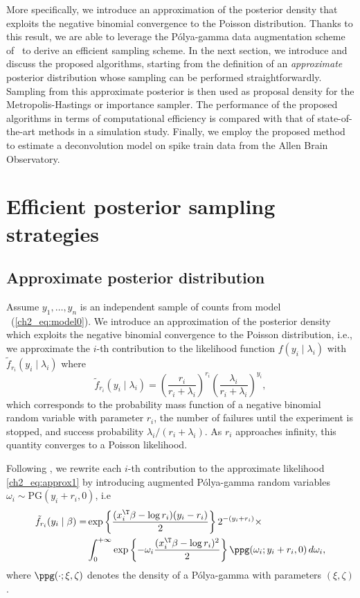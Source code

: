 More specifically, we introduce an approximation of the posterior density that exploits the negative binomial convergence to the Poisson distribution. Thanks to this result, we are able to leverage the P\'olya-gamma data augmentation scheme of~\cite{polson_scott_2013} to derive an efficient sampling scheme. 
In the next section, we introduce and discuss the proposed algorithms, starting from the definition of an \emph{approximate} posterior distribution whose sampling can be performed straightforwardly.
Sampling from this approximate posterior is then used as proposal density for the Metropolis-Hastings or importance sampler. The performance of the proposed algorithms in terms of computational efficiency is compared with that of state-of-the-art methods in a simulation study. Finally, we employ the proposed method to estimate a deconvolution model on spike train data from the Allen Brain Observatory.


\vfill

\section{Efficient posterior sampling strategies}
\label{ch2_sec:2}

\subsection{Approximate posterior distribution}\label{ch2_sec:approx_distr}

Assume $y_1,\dots,y_n$ is an independent sample of counts from model ~(\ref{ch2_eq:model0}). 
We introduce an approximation of the posterior density which exploits the negative binomial convergence to the Poisson distribution, i.e., we approximate the $i$-th contribution to the likelihood function $f(y_i \mid \lambda_i)$ with $\tilde{f}_{r_i}(y_i \mid \lambda_i)$ where 
\begin{equation}
\tilde{f}_{r_i}(y_i \mid \lambda_i) = \left( \frac{r_i}{r_i + \lambda_i}\right)^{r_i} \left(\frac{\lambda_i}{r_i+ \lambda_i}\right)^{y_i},
\label{ch2_eq:approx1}
\end{equation}
which corresponds to the probability mass function of a negative binomial random variable with parameter $r_i$, the number of failures until the experiment is stopped, and success probability $\lambda_i/(r_i+\lambda_i)$. As $r_i$ approaches infinity, this quantity converges to a Poisson likelihood.

Following \cite{polson_scott_2013}, we rewrite each $i$-th contribution to the approximate likelihood \eqref{ch2_eq:approx1} by introducing augmented P\'olya-gamma random variables $\omega_i \sim \mbox{PG}(y_i+r_i,0)$, i.e
\begin{align*}
\tilde{f}_{r_i}(y_i \mid \beta) = & \exp\left\{ \frac{(x_i^\T \beta - \log r_i)(y_i-r_i)}{2} \right\} 2^{-(y_i+r_i)} \times \\ 
& \int_{0}^{+\infty} \exp\left\{-\omega_i\frac{(x_i^\T \beta - \log r_i)^2}{2} \right\} \ppg(\omega_i; y_i + r_i,0) \, d\omega_i,   
\end{align*}
where $\ppg(\cdot; \xi,\zeta)$ denotes the density of a P\'olya-gamma with parameters $( \xi,\zeta)$. 
%

